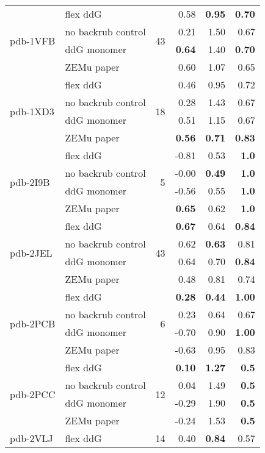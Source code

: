 {\begin{longtable}{llrrrr}
\hline
 \multirow{ 4}{*}{pdb-1VFB} & flex ddG & \multirow{ 4}{*}{43} & 0.58 & \textbf{0.95} & \textbf{0.70}  \\
 & no backrub control & & 0.21 & 1.50 & 0.67  \\
 & ddG monomer & & \textbf{0.64} & 1.40 & \textbf{0.70}  \\
 & ZEMu paper & & 0.60 & 1.07 & 0.65  \\
\hline
 \multirow{ 4}{*}{pdb-1XD3} & flex ddG & \multirow{ 4}{*}{18} & 0.46 & 0.95 & 0.72  \\
 & no backrub control & & 0.28 & 1.43 & 0.67  \\
 & ddG monomer & & 0.51 & 1.15 & 0.67  \\
 & ZEMu paper & & \textbf{0.56} & \textbf{0.71} & \textbf{0.83}  \\
\hline
 \multirow{ 4}{*}{pdb-2I9B} & flex ddG & \multirow{ 4}{*}{5} & -0.81 & 0.53 & \textbf{1.0}  \\
 & no backrub control & & -0.00 & \textbf{0.49} & \textbf{1.0}  \\
 & ddG monomer & & -0.56 & 0.55 & \textbf{1.0}  \\
 & ZEMu paper & & \textbf{0.65} & 0.62 & \textbf{1.0}  \\
\hline
 \multirow{ 4}{*}{pdb-2JEL} & flex ddG & \multirow{ 4}{*}{43} & \textbf{0.67} & 0.64 & \textbf{0.84}  \\
 & no backrub control & & 0.62 & \textbf{0.63} & 0.81  \\
 & ddG monomer & & 0.64 & 0.70 & \textbf{0.84}  \\
 & ZEMu paper & & 0.48 & 0.81 & 0.74  \\
\hline
 \multirow{ 4}{*}{pdb-2PCB} & flex ddG & \multirow{ 4}{*}{6} & \textbf{0.28} & \textbf{0.44} & \textbf{1.00}  \\
 & no backrub control & & 0.23 & 0.64 & 0.67  \\
 & ddG monomer & & -0.70 & 0.90 & \textbf{1.00}  \\
 & ZEMu paper & & -0.63 & 0.95 & 0.83  \\
\hline
 \multirow{ 4}{*}{pdb-2PCC} & flex ddG & \multirow{ 4}{*}{12} & \textbf{0.10} & \textbf{1.27} & \textbf{0.5}  \\
 & no backrub control & & 0.04 & 1.49 & \textbf{0.5}  \\
 & ddG monomer & & -0.29 & 1.90 & \textbf{0.5}  \\
 & ZEMu paper & & -0.24 & 1.53 & \textbf{0.5}  \\
\hline
 \multirow{ 4}{*}{pdb-2VLJ} & flex ddG & \multirow{ 4}{*}{14} & 0.40 & \textbf{0.84} & 0.57  \\

\end{longtable}}
